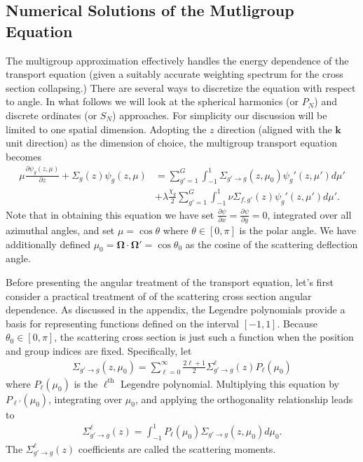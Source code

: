 \documentclass[11pt]{article}
\renewcommand\vec{\mathbf}
\begin{document}
\subsection{Numerical Solutions of the Mutligroup Equation}
\label{sec:orgheadline58}
The multigroup approximation effectively handles the energy dependence of the transport equation (given a suitably accurate weighting spectrum for the cross section collapsing.)  There are several ways to discretize the equation with respect to angle.  In what follows we will look at the spherical harmonics (or \(P_N\)) and discrete ordinates (or \(S_N\)) approaches.  For simplicity our discussion will be limited to one spatial dimension.  Adopting the \(z\) direction (aligned with the \(\vec{k}\) unit direction) as the dimension of choice, the multigroup transport equation becomes
\begin{align}
  \mu \frac{\partial \psi_g(z,\mu)}{\partial z}
  + \Sigma_g(z) \psi_g(z,\mu)
  &= \sum_{g'=1}^G \int_{-1}^1 \Sigma_{g'\rightarrow g}(z, \mu_0) \psi_g'(z,\mu') d\mu' \\
  &+ \lambda\frac{\chi_g}{2} \sum_{g'=1}^G \int_{-1}^1 \nu\Sigma_{f,g'}(z) \psi_g'(z,\mu') d\mu'.
  \label{eq::1dMgTransportEqn}
\end{align}
Note that in obtaining this equation we have set \(\frac{\partial \psi}{\partial x} = \frac{\partial \psi}{\partial y} = 0\), integrated over all azimuthal angles, and set \(\mu=\cos\theta\) where \(\theta \in [0,\pi]\) is the polar angle.  We have additionally defined \(\mu_0 = \vec{\Omega}\cdot\vec{\Omega}' = \cos\theta_0\) as the cosine of the scattering deflection angle.

Before presenting the angular treatment of the transport equation, let's first consider a practical treatment of of the scattering cross section angular dependence.  As discussed in the appendix, the Legendre polynomials provide a basis for representing functions defined on the interval \([-1,1]\).  Because \(\theta_0 \in [0,\pi]\), the scattering cross section is just such a function when the position and group indices are fixed.  Specifically, let
\begin{align}
  \Sigma_{g'\rightarrow g}(z, \mu_0) = \sum_{\ell=0}^\infty \frac{2\ell+1}{2} \Sigma_{g' \rightarrow g}^\ell(z) P_\ell(\mu_0)
\end{align}
where \(P_\ell(\mu_0)\) is the \(\ell^\text{th}\) Legendre polynomial.  Multiplying this equation by \(P_{\ell'}(\mu_0)\), integrating over \(\mu_0\), and applying the orthogonality relationship leads to
\begin{align}
  \Sigma_{g' \rightarrow g}^\ell(z) = \int_{-1}^1 P_{\ell}(\mu_0)\Sigma_{g'\rightarrow g}(z, \mu_0) d\mu_0.
\end{align}
The \(\Sigma_{g' \rightarrow g}^\ell(z)\) coefficients are called the scattering moments.
\end{document}
